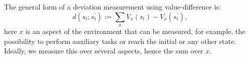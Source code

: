 \documentclass[12pt,A4]{report}
\theoremstyle{definition}
\begin{document}
The general form of a deviation measurement using value-difference is:
  \[d(s_t;s^{\prime}_t) := \sum_x V_x(s_t) - V_x(s^{\prime}_t) ,\]
here $x$ is an aspect of the environment that can be measured, for example, the possibility to perform auxiliary tasks or reach the initial or any other state. Ideally, we measure this over several aspects, hence the sum over $x$.



\end{document}
